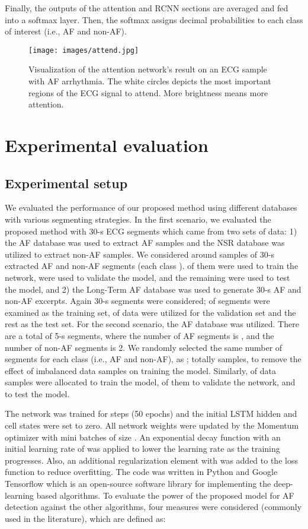 \documentclass[conference]{IEEEtran}
\begin{document}
Finally, the outputs of the attention and RCNN sections are averaged and fed into a softmax layer. Then, the softmax assigns decimal probabilities to each class of interest (i.e., AF and non-AF).  

\begin{figure*}[t!]
\centering
  \texttt{[image: images/attend.jpg]}
  \caption{Visualization of the attention network's result on an ECG sample with AF arrhythmia. The white circles depicts the most important regions of the ECG signal to attend. More brightness means more attention.  }
  \label{fig:attend}

\end{figure*}  
\section{Experimental evaluation}
\label{sec:experimental}
\subsection{Experimental setup}
\label{sec:setup}
We evaluated the performance of our proposed method using different databases with various segmenting strategies.
In the first scenario, we evaluated the proposed method with 30-s ECG segments which came from two sets of data: 1) the AF database was used to extract AF samples and the NSR database was utilized to extract non-AF samples. We considered around  samples of 30-s extracted AF and non-AF segments (each class ).  of them were used to train the network,  were used to validate the model, and the remaining  were used to test the model, and 2) the Long-Term AF database was used to generate 30-s AF and non-AF excerpts. Again  30-s segments were considered;  of segments were examined as the training set,  of data were utilized for the validation set and the rest  as the test set. For the second scenario, the AF database was utilized. There are a total of  5-s segments, where the number of AF segments is , and the number of non-AF segments is 2. We randomly selected the same number of segments for each class (i.e., AF and non-AF), as ; totally  samples, to remove the effect of imbalanced data samples on training the model. Similarly,  of data samples were allocated to train the model,  of them to validate the network, and  to test the model.

The network was trained for  steps (50 epochs) and the initial LSTM hidden and cell states were set to zero. All network weights were updated by the Momentum optimizer with mini batches of size . An exponential decay function with an initial learning rate of  was applied to lower the learning rate as the training progresses. Also, an additional  regularization element with  was added to the loss function to reduce overfitting. The code was written in Python and Google Tensorflow which is an open-source software library for implementing the deep-learning based algorithms. To  evaluate  the  power  of  the  proposed  model  for  AF  detection  against  the  other
algorithms, four measures were considered (commonly used in the literature), which are defined as:
\end{document}
